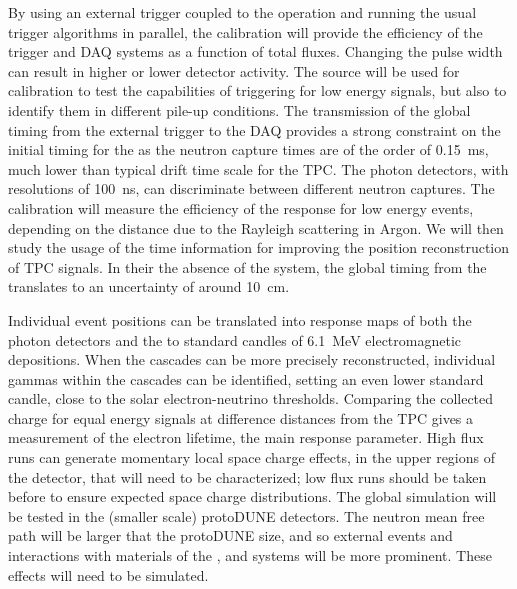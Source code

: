By using an external trigger coupled to the  operation and running the usual trigger algorithms in parallel, the calibration will provide the efficiency of the trigger and DAQ systems as a function of total fluxes. Changing the pulse width can result in 
higher or lower detector activity. The source will be used for  calibration to test
the capabilities of triggering for low energy signals, but also 
to identify them in different pile-up conditions.
The transmission of the global timing from the external  trigger to the DAQ provides a strong constraint on the initial timing for the 
as the neutron capture times are of the order of 0.15~ms, much lower than typical drift time scale for the TPC. The photon detectors, with resolutions of 100~ns, can discriminate between different neutron captures. The calibration will measure the efficiency of the  response for low energy events, depending on the distance due to the Rayleigh scattering in Argon. We will then study the usage of the  time information for improving the position reconstruction of TPC signals. In their 
the absence of the  system, the global timing from the  translates to an uncertainty of around 10~cm.

Individual event positions can be translated into response maps of both the photon detectors and the  to standard candles of 6.1~MeV electromagnetic depositions. When the cascades can be more precisely reconstructed, individual gammas within the cascades can be identified, setting an even lower standard candle, close to the solar electron-neutrino thresholds. Comparing the collected charge for equal energy signals at difference distances from the TPC gives a measurement of the electron lifetime, the main response parameter. High  flux runs can generate momentary local space charge effects, in the 
upper regions of the detector, that will need to be characterized; low flux runs should be taken before to ensure 
expected space charge distributions.
The global simulation will be tested in the (smaller scale) protoDUNE detectors. The neutron mean free path will be larger that the protoDUNE size, and so 
external events and interactions with materials of the ,  and  systems will be more prominent. These effects will need to be simulated.

